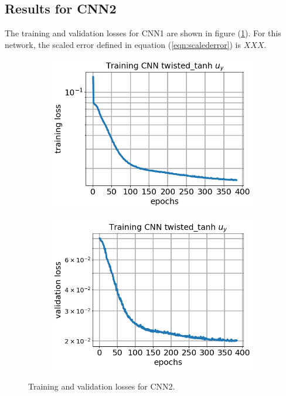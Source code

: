 \documentclass[12pt]{article}
\begin{document}
\subsection{\label{sect:resultscnn2}Results for CNN2}
The training and validation losses for CNN1 are shown in figure (\ref{fig:cnn2losses}). For this network, the scaled error defined in equation (\ref{eqn:scalederror}) is $XXX$.
\begin{figure}[h]
  \centering
  \begin{subfigure}[c]{0.45\linewidth}
    \includegraphics[totalheight=4cm]{Figures/Results2/loss.png}
  \end{subfigure}
%  
  \begin{subfigure}[c]{0.45\linewidth}
    \includegraphics[totalheight=4cm]{Figures/Results2/val_loss.png}
  \end{subfigure}
  \caption{\label{fig:cnn2losses} Training and validation losses for CNN2.}
\end{figure}
%
\end{document}
